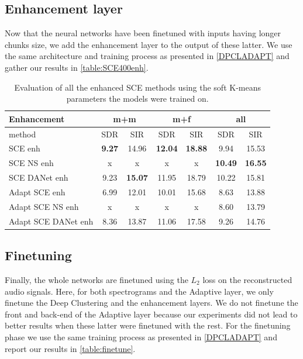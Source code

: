 \documentclass[master, tikz, final,11pt, dvipdfmx]{iscs-thesis}
\begin{document}
\subsection{Enhancement layer}
\label{enh}

Now that the neural networks have been finetuned with inputs having longer chunks size, we add the enhancement layer to the output of these latter. We use the same architecture and training process as presented in \autoref{DPCLADAPT} and gather our results in \autoref{table:SCE400enh}.

\begin{table}[h!]
\begin{tabular}{l|c|c|c|c|c|c}
Enhancement & \multicolumn{2}{c|}{m+m} & \multicolumn{2}{c|}{m+f} & \multicolumn{2}{c}{all} \\ 
\hline 
method & SDR & SIR & SDR & SIR & SDR & SIR \\ 
\hline
SCE enh & \textbf{9.27} & 14.96 & \textbf{12.04} & \textbf{18.88} & 9.94 & 15.53 \\ 
SCE NS enh & x & x & x & x & \textbf{10.49} & \textbf{16.55} \\ 
SCE DANet enh & 9.23 & \textbf{15.07} & 11.95 & 18.79 & 10.22 & 15.81 \\ 
\hline 
\hline 
Adapt SCE enh & 6.99 & 12.01 & 10.01 & 15.68 & 8.63 & 13.88 \\ 
Adapt SCE NS enh & x & x & x & x & 8.60 & 13.79 \\ 
Adapt SCE DANet enh  & 8.36 & 13.87 & 11.06 & 17.58 & 9.26 & 14.76 \\ 

\end{tabular}
\caption[Evaluation of all the enhanced SCE methods]{Evaluation of all the enhanced SCE methods using the soft K-means parameters the models were trained on.}
\label{table:SCE400enh}
\end{table}

\subsection{Finetuning}
\label{finetuning}

Finally, the whole networks are finetuned using the $L_2$ loss on the reconstructed audio signals. Here, for both spectrograms and the Adaptive layer, we only finetune the Deep Clustering and the enhancement layers. We do not finetune the front and back-end of the Adaptive layer because our experiments did not lead to better results when these latter were finetuned with the rest. For the finetuning phase we use the same training process as presented in \autoref{DPCLADAPT} and report our results in \autoref{table:finetune}.
\end{document}
